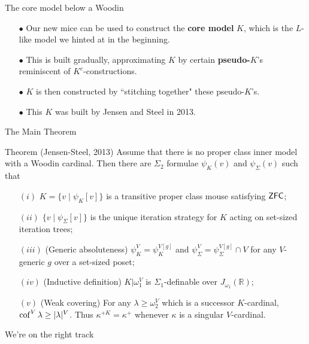 \begin{frame}{The core model below a Woodin}
\begin{itemize}
\pause\item[$\bullet$] Our new mice can be used to construct the \textbf{core model} $K$, which is the $L$-like model we hinted at in the beginning.
\pause\item[$\bullet$] This is built gradually, approximating $K$ by certain \textbf{pseudo-$K$}'s reminiscent of $K^c$-constructions.
\pause\item[$\bullet$] $K$ is then constructed by ``stitching together" these pseudo-$K$'s.
\pause\item[$\bullet$] This $K$ was built by Jensen and Steel in 2013.
\end{itemize}
\end{frame}

\begin{frame}{The Main Theorem}
\begin{block}{Theorem (Jensen-Steel, 2013)}
Assume that there is no proper class inner model with a {\color{olive}Woodin cardinal}. Then there are $\Sigma_2$ formulae $\psi_K(v)$ and $\psi_{\Sigma}(v)$ such that
\begin{itemize}
\item[$(i)$] $K=\{v\mid\psi_K[v]\}$ is a transitive proper class mouse satisfying $\operatorname{\mathsf{ZFC}}$;
\item[$(ii)$] $\{v\mid\psi_{\Sigma}[v]\}$ is the unique iteration strategy for $K$ acting on set-sized iteration trees;
\item[$(iii)$] (Generic absoluteness) $\psi_K^V=\psi_K^{V[g]}$ and $\psi_{\Sigma}^V=\psi_{\Sigma}^{V[g]}\cap V$ for any $V$-generic $g$ over a set-sized poset;
\item[$(iv)$] (Inductive definition) $K|\omega_1^V$ is $\Sigma_1$-definable over $J_{\omega_1}(\mathbb R)$;
\item[$(v)$] (Weak covering) For any $\lambda\geq\omega_2^V$ which is a successor $K$-cardinal, $\operatorname{cof}^V\lambda\geq|\lambda|^V$. Thus $\kappa^{+K}=\kappa^+$ whenever $\kappa$ is a singular $V$-cardinal.
\end{itemize}
\end{block}
\end{frame}

\begin{frame}{We're on the right track}
\begin{center}
\end{center}
\end{frame}

